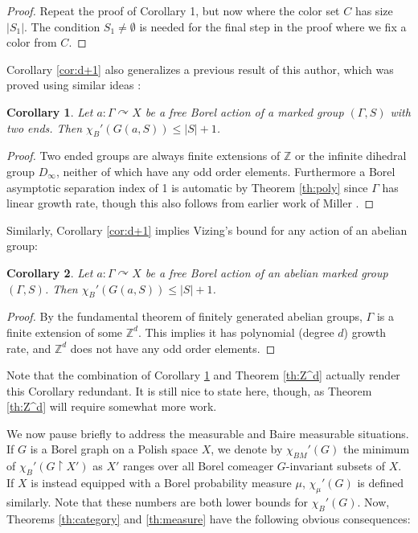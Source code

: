 \documentclass[12pt]{article}
\newcommand{\0}{\varnothing}
\newcommand{\Z}{\mathbb{Z}}
\newcommand{\res}{\upharpoonright}
\newtheorem{corollary}{Corollary}
\begin{document}
\begin{proof}
Repeat the proof of Corollary 1, but now where the color set $C$ has size $|S_1|$. The condition $S_1 \neq \emptyset$ is needed for the final step in the proof where we fix a color from $C$.
\end{proof}


Corollary \ref{cor:d+1} also generalizes a previous result of this author, which was proved using similar ideas \cite{W21}: 

\begin{corollary}\label{cor:2end}
Let $a:\Gamma \curvearrowright X$ be a free Borel action of a marked group $(\Gamma,S)$ with two ends. Then $\chi_B'(G(a,S)) \leq |S|+1$.
\end{corollary}
\begin{proof}
Two ended groups are always finite extensions of $\Z$ or the infinite dihedral group $D_\infty$, neither of which have any odd order elements. Furthermore a Borel asymptotic separation index of 1 is automatic by Theorem \ref{th:poly} since $\Gamma$ has linear growth rate, though this also follows from earlier work of Miller \cite{2end}.
\end{proof}

Similarly, Corollary \ref{cor:d+1} implies Vizing's bound for any action of an abelian group:

\begin{corollary}
Let $a:\Gamma \curvearrowright X$ be a free Borel action of an abelian marked group $(\Gamma,S)$. Then $\chi_B'(G(a,S)) \leq |S|+1$.
\end{corollary}
\begin{proof}
By the fundamental theorem of finitely generated abelian groups, $\Gamma$ is a finite extension of some $\Z^d$. This implies it has polynomial (degree $d$) growth rate, and $\Z^d$ does not have any odd order elements.
\end{proof}

Note that the combination of Corollary \ref{cor:2end} and Theorem \ref{th:Z^d} actually render this Corollary redundant. It is still nice to state here, though, as Theorem \ref{th:Z^d} will require somewhat more work. 

We now pause briefly to address the measurable and Baire measurable situations. If $G$ is a Borel graph on a Polish space $X$, we denote by $\chi_{BM}'(G)$ the minimum of $\chi_B'(G \res X')$ as $X'$ ranges over all Borel comeager $G$-invariant subsets of $X$. If $X$ is instead equipped with a Borel probability measure $\mu$, $\chi_\mu'(G)$ is defined similarly. Note that these numbers are both lower bounds for $\chi_B'(G)$. Now, Theorems \ref{th:category} and \ref{th:measure} have the following obvious consequences:
\end{document}
